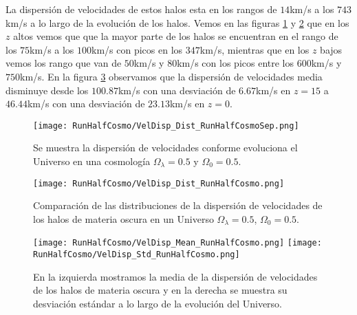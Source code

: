 La dispersión de velocidades de estos halos esta en los rangos de $14$km/s a los $743$km/s a lo largo de la evolución de los halos. Vemos en las figuras \ref{fig:HalfCosmo-VelDispDistSep} y \ref{fig:HalfCosmo-VelDispDist} que en los $z$ altos vemos que que la mayor parte de los halos se encuentran en el rango de los $75$km/s a los $100$km/s con picos en los $347$km/s, mientras que en los $z$ bajos vemos los rango que van de $50$km/s y $80$km/s con los picos entre los $600$km/s y $750$km/s. En la figura \ref{fig:HalfCosmo-VelDispStats} observamos que la dispersión de velocidades media disminuye desde los $100.87$km/s con una desviación de $6.67$km/s en $z=15$ a $46.44$km/s con una desviación de $23.13$km/s en $z=0$.

\begin{figure}[H]
    \centering
    \texttt{[image: RunHalfCosmo/VelDisp\_Dist\_RunHalfCosmoSep.png]}
    \caption[Dispersión de velocidades]{\footnotesize Se muestra la dispersión de velocidades conforme evoluciona el Universo en una cosmología $\Omega_\lambda = 0.5 $ y $\Omega_0 = 0.5$.}
    \label{fig:HalfCosmo-VelDispDistSep}
\end{figure}

\begin{figure}[H]
    \centering
    \texttt{[image: RunHalfCosmo/VelDisp\_Dist\_RunHalfCosmo.png]}
    \caption[Distribución de la dispersión de velocidades]{\footnotesize Comparación de las distribuciones de la dispersión de velocidades de los halos de materia oscura en un Universo $\Omega_\lambda = 0.5 $, $\Omega_0 = 0.5$.}
    \label{fig:HalfCosmo-VelDispDist}
\end{figure}

\begin{figure}[H]
    \centering
    \texttt{[image: RunHalfCosmo/VelDisp\_Mean\_RunHalfCosmo.png]}
    \texttt{[image: RunHalfCosmo/VelDisp\_Std\_RunHalfCosmo.png]}
    \caption[Media y desviación estándar de la dispersión de velocidades]{\footnotesize En la izquierda mostramos la media de la dispersión de velocidades de los halos de materia oscura y en la derecha se muestra su desviación estándar a lo largo de la evolución del Universo.}
    \label{fig:HalfCosmo-VelDispStats}
\end{figure}

